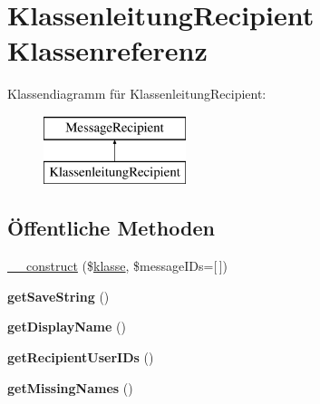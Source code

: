 \hypertarget{class_klassenleitung_recipient}{}\section{Klassenleitung\+Recipient Klassenreferenz}
\label{class_klassenleitung_recipient}
Klassendiagramm für Klassenleitung\+Recipient\+:\begin{figure}[H]
\begin{center}
\leavevmode
\includegraphics[height=2.000000cm]{class_klassenleitung_recipient}
\end{center}
\end{figure}
\subsection*{Öffentliche Methoden}
\begin{DoxyCompactItemize}
\item 
\mbox{\hyperlink{class_klassenleitung_recipient_a336506594aa65ae6ab5bf4a12ee10e02}{\+\_\+\+\_\+construct}} (\$\mbox{\hyperlink{classklasse}{klasse}}, \$message\+I\+Ds=\mbox{[}$\,$\mbox{]})
\item 
\mbox{\label{class_klassenleitung_recipient_a6188253b34f731885745fd8927f19697}} 
{\bfseries get\+Save\+String} ()
\item 
\mbox{\label{class_klassenleitung_recipient_a86c883e514e23240a32bee53ec1d238d}} 
{\bfseries get\+Display\+Name} ()
\item 
\mbox{\label{class_klassenleitung_recipient_a12ce1f58b58488424c30ecb47a15003b}} 
{\bfseries get\+Recipient\+User\+I\+Ds} ()
\item 
\mbox{\label{class_klassenleitung_recipient_a553caa97963cdd7f79ddd4569b62e3b3}} 
{\bfseries get\+Missing\+Names} ()
\end{DoxyCompactItemize}
